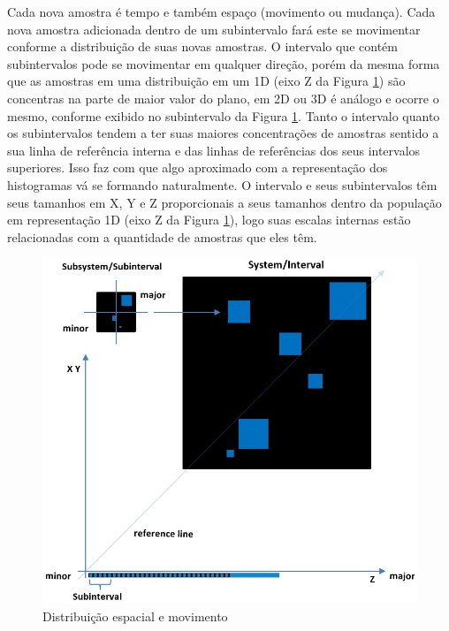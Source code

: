 Cada nova amostra é tempo e também espaço (movimento ou mudança). Cada nova amostra adicionada dentro de um subintervalo fará este se movimentar conforme a distribuição de suas novas amostras. O intervalo que contém subintervalos pode se movimentar em qualquer direção, porém da mesma forma que as amostras em uma distribuição em um 1D (eixo Z da Figura \ref{fig:consciousness_space_plan}) são concentras na parte de maior valor do plano, em 2D ou 3D é análogo e ocorre o mesmo, conforme exibido no subintervalo da Figura \ref{fig:consciousness_space_plan}. Tanto o intervalo quanto os subintervalos tendem a ter suas maiores concentrações de amostras sentido a sua linha de referência interna e das linhas de referências dos seus intervalos superiores. Isso faz com que algo aproximado com a representação dos histogramas vá se formando naturalmente. O intervalo e seus subintervalos têm seus tamanhos em X, Y e Z proporcionais a seus tamanhos dentro da população em representação 1D (eixo Z da Figura \ref{fig:consciousness_space_plan}), logo suas escalas internas estão relacionadas com a quantidade de amostras que eles têm.
	\begin{figure}[H]
	\caption{Distribuição espacial e movimento}
	\label{fig:consciousness_space_plan}
	\centering
	\includegraphics[scale=.6]{sections/images/consciousness_space_plan.jpg}
	\end{figure}
	
